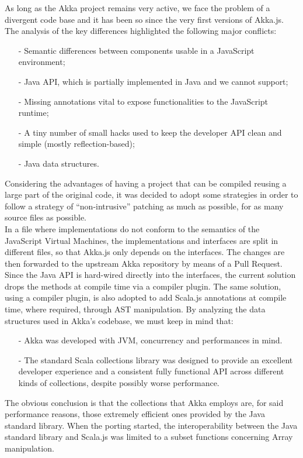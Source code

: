 \documentclass{sig-alternate}
\begin{document}
As long as the Akka project remains very active, we face the problem of a divergent code base and it has been so since the very first versions of Akka.js.
The analysis of the key differences highlighted the following major conflicts:
\begin{itemize}
	\item[-] Semantic differences between components usable in a JavaScript environment;
	\item[-] Java API, which is partially implemented in Java and we cannot support;
	\item[-] Missing annotations vital to expose functionalities to the JavaScript runtime;
	\item[-] A tiny number of small hacks used to keep the developer API clean and simple (mostly reflection-based);
	\item[-] Java data structures.
\end{itemize}
Considering the advantages of having a project that can be compiled reusing a large part of the original code, it was decided to adopt some strategies in order to follow a strategy of ``non-intrusive'' patching as much as possible, for as many source files as possible.
\\
In a file where implementations do not conform to the semantics of the JavaScript Virtual Machines, the implementations and interfaces are split in different files, so that Akka.js only depends on the interfaces. The changes are then forwarded to the upstream Akka repository by means of a Pull Request.
Since the Java API is hard-wired directly into the interfaces, the current solution drops the methods at compile time via a compiler plugin.
The same solution, using a compiler plugin, is also adopted to add Scala.js annotations at compile time, where required, through AST manipulation.
By analyzing the data structures used in Akka's codebase, we must keep in mind that:
\begin{itemize}
	\item[-] Akka was developed with JVM, concurrency and performances in mind.
	\item[-] The standard Scala collections library was designed to provide an excellent developer experience and a consistent fully functional API across different kinds of collections, despite possibly worse performance.
\end{itemize}
The obvious conclusion is that the collections that Akka employs are, for said performance reasons, those extremely efficient ones provided by the Java standard library.
When the porting started, the interoperability between the Java standard library and Scala.js was limited to a subset functions concerning Array manipulation.
\end{document}
